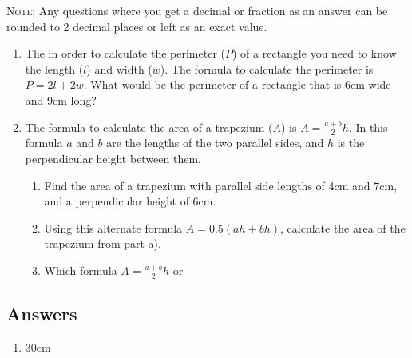 \documentclass[a4paper,12pt]{article}
\begin{document}
\textsc{Note}: Any questions where you get a decimal or fraction 
as an answer can be rounded to 2 decimal places or left as 
an exact value.

\begin{enumerate}
\item The in order to calculate the perimeter ($P$) of a rectangle 
    you need to know the length ($l$) and width ($w$). The formula
    to calculate the perimeter is $P = 2l + 2w$. What would be
    the perimeter of a rectangle that is 6cm wide and 9cm long?

\item The formula to calculate the area of a trapezium ($A$) is
    $\displaystyle A = \frac{a + b}{2}h$. In this formula $a$ and 
    $b$ are the lengths of the two parallel sides, and $h$ is the 
    perpendicular height between them.
    \begin{enumerate}
    \item Find the area of a trapezium with parallel side lengths 
        of 4cm and 7cm, and a perpendicular height of 6cm.
    \item Using this alternate formula 
        $\displaystyle A = 0.5(ah + bh)$, calculate the 
        area of the trapezium from part a).
    \item Which formula $\displaystyle A = \frac{a + b}{2}h$
        or 
    \end{enumerate}

\end{enumerate}

\newpage
\subsection*{Answers}

\begin{enumerate}
\item 30cm %
\end{enumerate}
\end{document}
